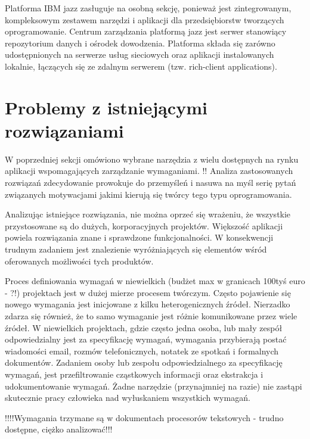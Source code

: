       Platforma IBM jazz zasługuje na osobną sekcję, ponieważ jest zintegrowanym, kompleksowym zestawem narzędzi i aplikacji dla przedsiębiorstw tworzących oprogramowanie. Centrum zarządzania platformą jazz jest serwer stanowiący repozytorium danych i ośrodek dowodzenia. Platforma składa się zarówno udostępnionych na serwerze usług sieciowych oraz aplikacji instalowanych lokalnie, łączących się ze zdalnym serwerem (tzw. rich-client applications). 

  \section{Problemy z istniejącymi rozwiązaniami}

      W poprzedniej sekcji omówiono wybrane narzędzia z wielu dostępnych na rynku aplikacji wspomagających zarządzanie wymaganiami. !! Analiza zastosowanych rozwiązań zdecydowanie prowokuje do przemyśleń i nasuwa na myśl serię pytań związanych motywacjami jakimi kierują się twórcy tego typu oprogramowania. 

      Analizując istniejące rozwiązania, nie można oprzeć się wrażeniu, że wszystkie przystosowane są do dużych, korporacyjnych projektów. Większość aplikacji powiela rozwiązania znane i sprawdzone funkcjonalności. W konsekwencji trudnym zadaniem jest znalezienie wyróżniających się elementów wśród oferowanych możliwości tych produktów. 

      Proces definiowania wymagań w niewielkich (budżet max w granicach 100tyś euro - ?!) projektach jest w dużej mierze procesem twórczym. Często pojawienie się nowego wymagania jest inicjowane z kilku heterogenicznych źródeł. Nierzadko zdarza się również, że to samo wymaganie jest różnie komunikowane przez wiele źródeł. W niewielkich projektach, gdzie często jedna osoba, lub mały zespół odpowiedzialny jest za specyfikację wymagań, wymagania przybierają postać wiadomości email, rozmów telefonicznych, notatek ze spotkań i formalnych dokumentów. Zadaniem osoby lub zespołu odpowiedzialnego za specyfikację wymagań, jest przefiltrowanie cząstkowych informacji oraz ekstrakcja i udokumentowanie wymagań. Żadne narzędzie (przynajmniej na razie) nie zastąpi skutecznie pracy człowieka nad wyłuskaniem wszystkich wymagań. 

      !!!!Wymagania trzymane są w dokumentach procesorów tekstowych - trudno dostępne, ciężko analizować!!!
